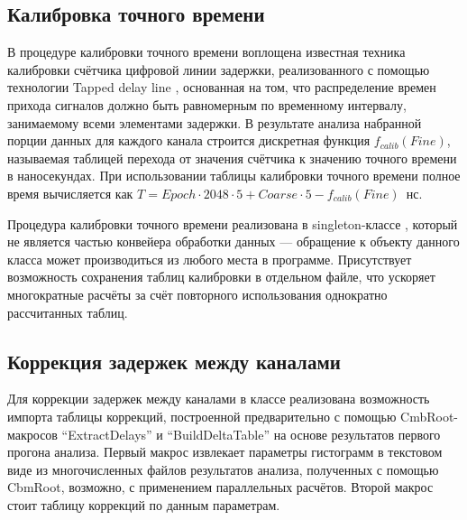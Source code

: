 \subsection{Калибровка точного времени}

В процедуре калибровки точного времени воплощена известная техника калибровки счётчика цифровой линии задержки, реализованного с помощью технологии Tapped delay line \cite{TDLCALIB}, основанная на том, что распределение времен прихода сигналов должно быть равномерным по временному интервалу, занимаемому всеми элементами задержки. В результате анализа набранной порции данных для каждого канала строится дискретная функция $ f_{calib}(Fine) $, называемая таблицей перехода от значения счётчика к значению точного времени в наносекундах. При использовании таблицы калибровки точного времени полное время вычисляется как $ T = Epoch \cdot 2048 \cdot 5 + Coarse \cdot 5 - f_{calib}(Fine) $~нс.

Процедура калибровки точного времени реализована в singleton-классе , который не является частью конвейера обработки данных --- обращение к объекту данного класса может производиться из любого места в программе. Присутствует возможность сохранения таблиц калибровки в отдельном файле, что ускоряет многократные расчёты за счёт повторного использования однократно рассчитанных таблиц.

\subsection{Коррекция задержек между каналами}

Для коррекции задержек между каналами в классе  реализована возможность импорта таблицы коррекций, построенной предварительно с помощью CmbRoot-макросов ``ExtractDelays'' и ``BuildDeltaTable'' на основе результатов первого прогона анализа. Первый макрос извлекает параметры гистограмм в текстовом виде из многочисленных файлов результатов анализа, полученных с помощью CbmRoot, возможно, с применением параллельных расчётов. Второй макрос стоит таблицу коррекций по данным параметрам.

